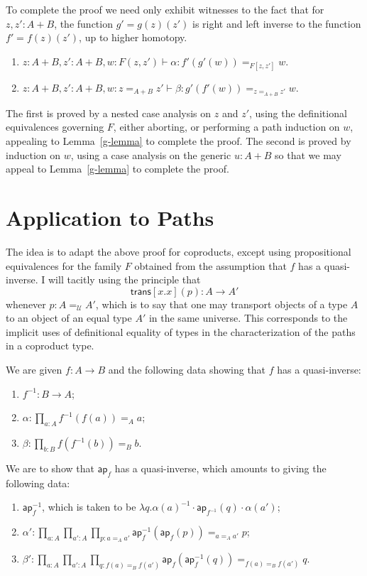 \documentclass{article}
\newcommand{\sumty}[2]{{#1}+{#2}}
\newcommand{\idty}[3]{{#2}\mathbin{=_{#1}}{#3}}
\newcommand{\family}[2]{{#1}.{#2}}
\newcommand{\prodty}[3]{\prod_{{#1}{:}{#2}}{#3}}
\newcommand{\lam}[2]{\lambda {#1}{.}{#2}}
\newcommand{\app}[2]{{#1}({#2})}
\newcommand{\pa}[1]{\mathsf{ap}_{#1}}
\newcommand{\univty}{\mathcal{U}}
\newcommand{\iv}[1]{#1^{-1}}
\newcommand{\concat}[2]{{#1}\cdot{#2}}
\newcommand{\transport}[2]{\mathsf{trans}[#1](#2)}
\begin{document}
To complete the proof we need only exhibit witnesses to the fact that for $z,z':\sumty{A}{B}$, the function  $g'=\app{\app{g}{z}}{z'}$ is right and left inverse to the function $f'=\app{\app{f}{z}}{z'}$, up to higher homotopy.
\begin{enumerate}
\item $z:\sumty{A}{B},z':\sumty{A}{B},w:F(z,z')\vdash \alpha : \idty{F[z,z']}{\app{f'}{\app{g'}{w}}}{w}$.
\item $z:\sumty{A}{B},z':\sumty{A}{B},w:\idty{\sumty{A}{B}}{z}{z'}\vdash \beta : \idty{\idty{\sumty{A}{B}}{z}{z'}}{\app{g'}{\app{f'}{w}}}{w}$.
\end{enumerate}

The first is proved by a nested case analysis on $z$ and $z'$, using the definitional equivalences governing $F$, either aborting, or performing a path induction on $w$, appealing to Lemma~\ref{g-lemma} to complete the proof.  The second is proved by induction on $w$, using a case analysis on the generic $u:\sumty{A}{B}$ so that we may appeal to Lemma~\ref{g-lemma} to complete the proof.

\section{Application to Paths}

The idea is to adapt the above proof for coproducts, except using propositional
equivalences for the family $F$ obtained from the assumption that $f$ has a
quasi-inverse.  I will tacitly using the principle
that $$\transport{\family{x}{x}}{p}:A\to A'$$ whenever
$p:\idty{\univty}{A}{A'}$, which is to say that one may transport objects of a
type $A$ to an object of an equal type $A'$ in the same universe.  This
corresponds to the implicit uses of definitional equality of types in the
characterization of the paths in a coproduct type.

We are given $f:A\to B$ and the following data showing that $f$ has a quasi-inverse:
\begin{enumerate}
\item $\iv{f}:B\to A$;
\item $\alpha:\prodty{a}{A}{\idty{A}{\app{\iv{f}}{\app{f}{a}}}{a}}$;
\item $\beta:\prodty{b}{B}{\idty{B}{\app{f}{\app{\iv{f}}{b}}}{b}}$.
\end{enumerate}

We are to show that $\pa{f}$ has a quasi-inverse, which amounts to giving the following data:
\begin{enumerate}
\item $\iv{\pa{f}}$, which is taken to be $\lam{q}{\concat{\concat{\iv{\app{\alpha}{a}}}{\app{\pa{\iv{f}}}{q}}}{\app{\alpha}{a'}}}$;
\item $\alpha':\prodty{a}{A}{\prodty{a'}{A}{\prodty{p}{\idty{A}{a}{a'}}{\idty{\idty{A}{a}{a'}}{\app{\iv{\pa{f}}}{\app{\pa{f}}{p}}}{p}}}}$;
\item $\beta':\prodty{a}{A}{\prodty{a'}{A}{\prodty{q}{\idty{B}{\app{f}{a}}{\app{f}{a'}}}{\idty{\idty{B}{\app{f}{a}}{\app{f}{a'}}}{\app{\pa{f}}{\app{\iv{\pa{f}}}{q}}}{q}}}}$.
\end{enumerate}
\end{document}
